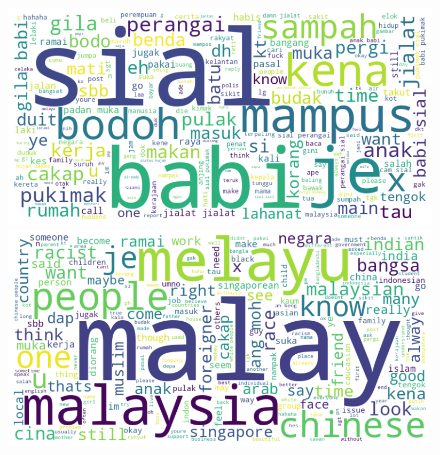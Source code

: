 \documentclass[preprint]{article}
\begin{document}
\begin{figure}[h]
\centering
\begin{minipage}[b]{0.45\textwidth}
\centering
\includegraphics[width=\linewidth]{img/harassment-wordcloud.png}
\end{minipage}
\hfill
\begin{minipage}[b]{0.45\textwidth}
\centering
\includegraphics[width=\linewidth]{img/racist-wordcloud.png}
\end{minipage}
\end{figure}
\end{document}
